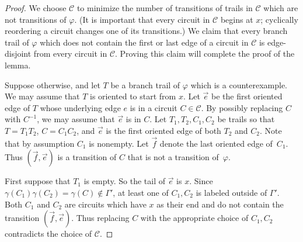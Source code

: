 \documentclass[10pt,a4paper]{amsart}
\newcommand{\C}{\mathcal{C}}
\begin{document}
\begin{proof}
    We choose $\C$ to minimize the number of transitions of trails in $\C$ which are not transitions of $\varphi$. (It is important that every circuit in $\C$ begins at $x$; cyclically reordering a circuit changes one of its transitions.) We claim that every branch trail of $\varphi$ which does not contain the first or last edge of a circuit in $\C$ is edge-disjoint from every circuit in $\C$. Proving this claim will complete the proof of the lemma.

    Suppose otherwise, and let $T$ be a branch trail of $\varphi$ which is a counterexample. We may assume that $T$ is oriented to start from $x$. Let $\vec{e}$ be the first oriented edge of $T$ whose underlying edge $e$ is in a circuit $C \in \C$. By possibly replacing $C$ with $C^{-1}$, we may assume that $\vec{e}$ is in $C$. Let $T_1, T_2, C_1, C_2$ be trails so that $T = T_1 T_2$, $C = C_1 C_2$, and $\vec{e}$ is the first oriented edge of both $T_2$ and $C_2$. Note that by assumption $C_1$ is nonempty. Let $\vec{f}$ denote the last oriented edge of~$C_1$. Thus $(\vec{f}, \vec{e})$ is a transition of $C$ that is not a transition of~$\varphi$.

    First suppose that $T_1$ is empty. So the tail of $\vec{e}$ is $x$. Since $\gamma(C_1)\gamma(C_2) = \gamma(C) \not\in \Gamma'$, at least one of $C_1, C_2$ is labeled outside of $\Gamma'$. Both $C_1$ and $C_2$ are circuits which have $x$ as their end and do not contain the transition $(\vec{f}, \vec{e})$. Thus replacing $C$ with the appropriate choice of $C_1, C_2$ contradicts the choice of $\C$. 
    
    

\end{proof}
\end{document}

